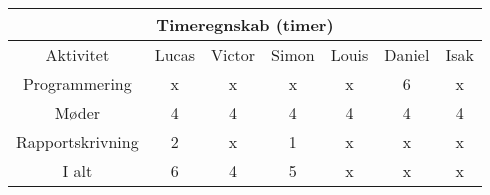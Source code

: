 \centering
\begin{tabular}{ |c|c|c|c|c|c|c|  }
 \hline
 \multicolumn{7}{|c|}{Timeregnskab (timer)} \\
 \hline
 Aktivitet & Lucas & Victor & Simon & Louis & Daniel & Isak\\
 \hline
 
 
 Programmering      & x & x & x & x & 6 & x \\
 
 Møder              & 4 & 4 & 4 & 4 & 4 & 4 \\
 
 Rapportskrivning   & 2 & x & 1 & x & x & x \\
 
 \hline
 
 I alt              & 6 & 4 & 5 & x & x & x \\
 
 
 \hline
\end{tabular}